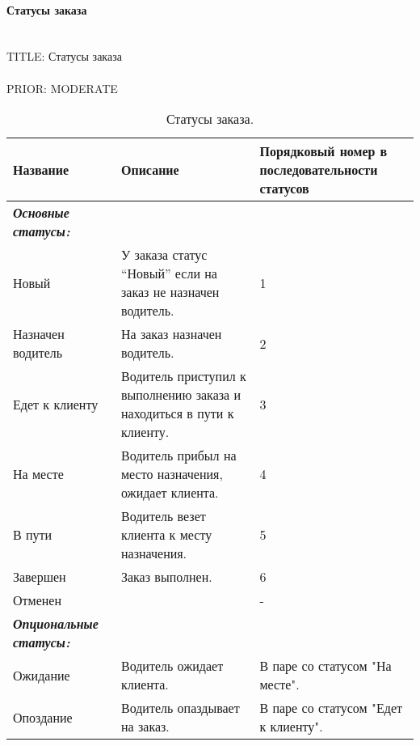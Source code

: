   \paragraph{Статусы заказа} \mbox{} \\

  	TITLE: Статусы заказа\\
    \\
    PRIOR: MODERATE\\



  	\begin{table}
  	\begin{center}
  	\caption {Статусы заказа.}
  	\label{table_order_status}
  	\setlength{\extrarowheight}{2mm}
  	\begin{tabular}{|p{3cm}|p{9cm}|p{3cm}|}

  	\hline     \textbf{Название} & \textbf{Описание} & \textbf{Порядковый номер в последовательности статусов}\\ [2mm]

  	\hline \textit{\textbf{Основные статусы:}}  &  & \\ [2mm]

  	\hline Новый  

  		& У заказа статус “Новый” если на заказ не назначен водитель. 
  		& 1 \\ [2mm]

  	\hline Назначен водитель  
  		& На заказ назначен водитель.  
  		& 2 \\ [2mm]

  	\hline Едет к клиенту 
  		& Водитель приступил к выполнению заказа и находиться в пути к клиенту. 
  		& 3 \\ [2mm]

  	\hline На месте  
  		& Водитель прибыл на место назначения, ожидает клиента. 
  		& 4\\ [2mm]

  	\hline В пути  
  		& Водитель везет клиента к месту назначения. 
  		& 5\\ [2mm]

  	\hline Завершен  
  		& Заказ выполнен. 
  		& 6\\ [2mm]

  	\hline Отменен  &  & - \\ [2mm]

  	\hline \textit{\textbf{Опциональные статусы:}}  &  & \\ [2mm]

  	\hline Ожидание  & Водитель ожидает клиента. & В паре со статусом "На месте".\\ [2mm]
  	\hline Опоздание  & Водитель опаздывает на заказ. & В паре со статусом "Едет к клиенту".\\ [2mm]
  	\hline
  	\end{tabular}
  	\end{center}
    \end{table}

